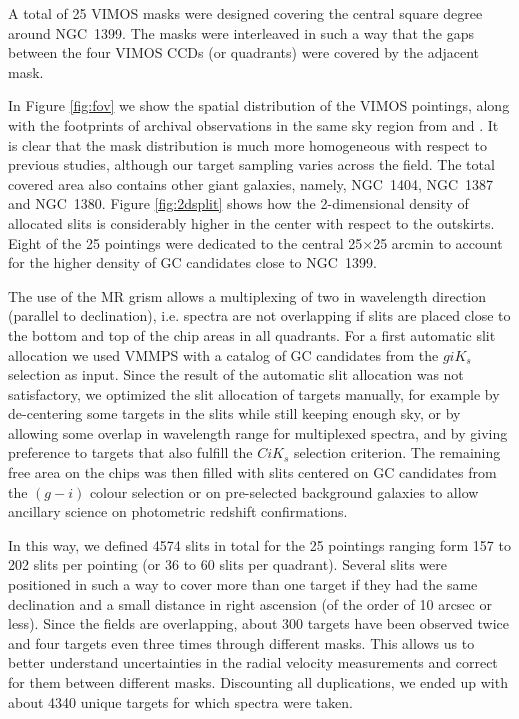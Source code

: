 \documentclass[useAMS,usenatbib]{mn2e}
\begin{document}
A total of 25 VIMOS masks were designed covering the central square degree 
around NGC~1399. The masks were interleaved in such a way that the gaps between 
the four VIMOS CCDs (or quadrants) were covered by the adjacent mask. 

In Figure \ref{fig:fov} we show the spatial distribution of the VIMOS 
pointings, along with the footprints of archival observations in the same sky 
region from \citet{Schuberth} and \citet{Bergond07}. It is clear that the mask 
distribution is much more homogeneous with respect to previous studies, 
although our target sampling varies across the field. The total covered area 
also contains other giant galaxies, namely, NGC~1404, NGC~1387 and NGC~1380.  
Figure \ref{fig:2dsplit} shows how the 2-dimensional density of allocated slits 
is considerably higher in the center with respect to the outskirts. Eight of 
the 25 pointings were dedicated to the central 25$\times$25 arcmin to account 
for the higher density of GC candidates close to NGC~1399. 

The use of the MR grism allows a multiplexing of two in wavelength direction 
(parallel to declination), i.e. spectra are not overlapping if slits are placed 
close to the bottom and top of the chip areas in all quadrants. 
For a first automatic slit allocation we used VMMPS with a catalog of GC 
candidates from the $giK_s$ selection as input. Since the result of the 
automatic slit allocation was not satisfactory, we optimized the slit 
allocation of targets manually, for example by de-centering some targets in the 
slits while still keeping enough sky, or by allowing some overlap in wavelength 
range for multiplexed spectra, and by giving preference to targets that also 
fulfill the $CiK_s$ selection criterion. The remaining free area on the chips 
was then filled with slits centered on GC candidates from the $(g-i)$ colour 
selection or on pre-selected background galaxies to allow ancillary science on 
photometric redshift confirmations.

In this way, we defined 4574 slits in total for the 25 pointings ranging form 
157 to 202 slits per pointing (or 36 to 60 slits per quadrant). Several slits 
were positioned in such a way to cover more than one target if they had the 
same declination and a small distance in right ascension (of the order of 
10 arcsec or less). Since the 
fields are overlapping, about 300 targets have been observed twice and four 
targets even three times through different masks. This allows us to better 
understand uncertainties in the radial velocity measurements and correct 
for them between different masks. Discounting all duplications, we ended up 
with about 4340 unique targets for which spectra were taken. 
\end{document}
